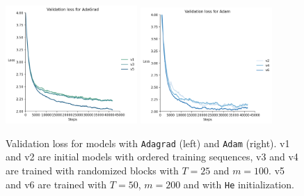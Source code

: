 \documentclass{article}
\begin{document}
	\begin{figure}[h!]
		\centering
		\includegraphics[width=5cm]{../plots/loss_comp_adagrad.png}
		\includegraphics[width=5cm]{../plots/loss_comp_adam.png}
		\caption{Validation loss for models with \texttt{Adagrad} (left) and \texttt{Adam} (right). v1 and v2 are initial models with ordered training sequences, v3 and v4 are trained with randomized blocks with $T = 25$ and $m = 100$. v5 and v6 are trained with $T = 50$, $m = 200$ and with \texttt{He} initialization.}
 	\end{figure}

\newpage
\end{document}

